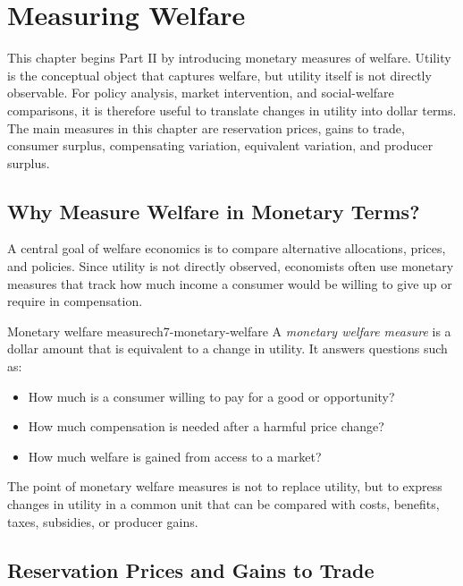 
\section{Measuring Welfare}

This chapter begins Part II by introducing monetary measures of welfare. Utility is the conceptual object that captures welfare, but utility itself is not directly observable. For policy analysis, market intervention, and social-welfare comparisons, it is therefore useful to translate changes in utility into dollar terms. The main measures in this chapter are reservation prices, gains to trade, consumer surplus, compensating variation, equivalent variation, and producer surplus.

\subsection{Why Measure Welfare in Monetary Terms?}

A central goal of welfare economics is to compare alternative allocations, prices, and policies. Since utility is not directly observed, economists often use monetary measures that track how much income a consumer would be willing to give up or require in compensation.

\begin{definition}{Monetary welfare measure}{ch7-monetary-welfare}
A \emph{monetary welfare measure} is a dollar amount that is equivalent to a change in utility. It answers questions such as:
\begin{itemize}
    \item How much is a consumer willing to pay for a good or opportunity?
    \item How much compensation is needed after a harmful price change?
    \item How much welfare is gained from access to a market?
\end{itemize}
\end{definition}

\begin{examtip}
The point of monetary welfare measures is not to replace utility, but to express changes in utility in a common unit that can be compared with costs, benefits, taxes, subsidies, or producer gains.
\end{examtip}

\subsection{Reservation Prices and Gains to Trade}

